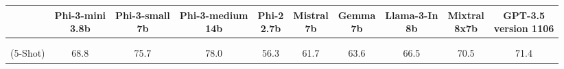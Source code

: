 \documentclass[11pt]{article}
\newcommand{\datasetcell}[3]{\makecell{ \large #1  \\  \tiny (#2) \tiny #3   }  }
\begin{document}
\begin{center}
\begin{adjustbox}{width=0.95\textwidth,center}
\begin{tabular}{ c||ccccccccc } 
\label{tbl:benchmarks}
&\makecell{Phi-3-mini\\ \footnotesize 3.8b } & \makecell{Phi-3-small\\ \footnotesize 7b } &  \makecell{Phi-3-medium\\ \footnotesize 14b } & \makecell{Phi-2 \\ \footnotesize 2.7b } & \makecell{Mistral\\ \footnotesize 7b } &\makecell{Gemma \\ \footnotesize 7b }&\makecell{Llama-3-In \\ \footnotesize 8b }  & \makecell{Mixtral\\ \footnotesize 8x7b }   &  \makecell{GPT-3.5 \\ \footnotesize version 1106}  \\
\hline & \\[-1.5ex]

\datasetcell{MMLU}{5-Shot}{\cite{hendrycks2021measuring} }         & 68.8 & 75.7 & 78.0 & 56.3 & 61.7& 63.6  & 66.5 & 70.5  & 71.4  \\ 



\end{tabular}
\end{adjustbox}
\end{center}
\end{document}
